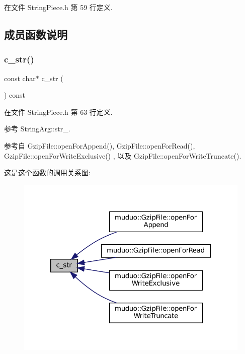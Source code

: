 在文件 String\+Piece.\+h 第 59 行定义.



\subsection{成员函数说明}
\mbox{\label{classmuduo_1_1StringArg_a14989d8fe448c5f947832aea3dae615a}} 
\subsubsection{\texorpdfstring{c\+\_\+str()}{c\_str()}}
{\footnotesize\ttfamily const char$\ast$ c\+\_\+str (\begin{DoxyParamCaption}{ }\end{DoxyParamCaption}) const\hspace{0.3cm}{\ttfamily [inline]}}



在文件 String\+Piece.\+h 第 63 行定义.



参考 String\+Arg\+::str\+\_\+.



参考自 Gzip\+File\+::open\+For\+Append(), Gzip\+File\+::open\+For\+Read(), Gzip\+File\+::open\+For\+Write\+Exclusive() , 以及 Gzip\+File\+::open\+For\+Write\+Truncate().

这是这个函数的调用关系图\+:
\nopagebreak
\begin{figure}[H]
\begin{center}
\leavevmode
\includegraphics[width=320pt]{classmuduo_1_1StringArg_a14989d8fe448c5f947832aea3dae615a_icgraph}
\end{center}
\end{figure}


